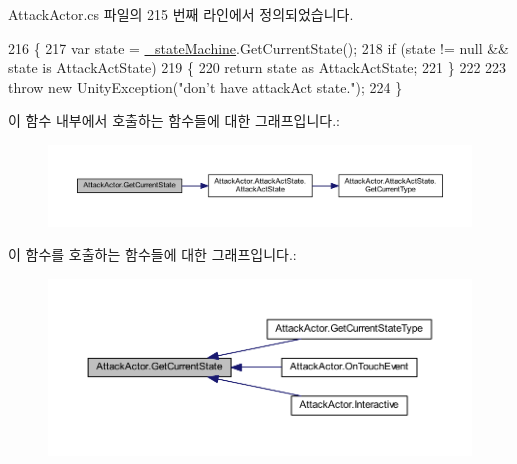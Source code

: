 Attack\+Actor.\+cs 파일의 215 번째 라인에서 정의되었습니다.


\begin{DoxyCode}
216     \{
217         var state = \hyperlink{class_attack_actor_aefebe59645532f127c1504abb12ffac8}{\_stateMachine}.GetCurrentState();
218         \textcolor{keywordflow}{if} (state != null && state is AttackActState)
219         \{
220             \textcolor{keywordflow}{return} state as AttackActState;
221         \}
222 
223         \textcolor{keywordflow}{throw} \textcolor{keyword}{new} UnityException(\textcolor{stringliteral}{"don't have attackAct state."});
224     \}
\end{DoxyCode}


이 함수 내부에서 호출하는 함수들에 대한 그래프입니다.\+:
\nopagebreak
\begin{figure}[H]
\begin{center}
\leavevmode
\includegraphics[width=350pt]{class_attack_actor_ac231e370a4747dc36886f4158b289898_cgraph}
\end{center}
\end{figure}




이 함수를 호출하는 함수들에 대한 그래프입니다.\+:
\nopagebreak
\begin{figure}[H]
\begin{center}
\leavevmode
\includegraphics[width=350pt]{class_attack_actor_ac231e370a4747dc36886f4158b289898_icgraph}
\end{center}
\end{figure}


